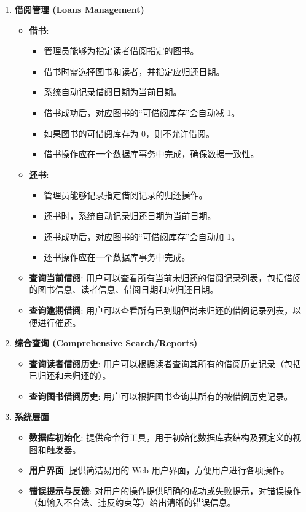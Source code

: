 \documentclass[11pt, a4paper]{article}
\begin{document}
\begin{enumerate}
    \item \textbf{借阅管理 (Loans Management)}
    \begin{itemize}
        \item \textbf{借书}:
        \begin{itemize}
            \item 管理员能够为指定读者借阅指定的图书。
            \item 借书时需选择图书和读者，并指定应归还日期。
            \item 系统自动记录借阅日期为当前日期。
            \item 借书成功后，对应图书的“可借阅库存”会自动减 1。
            \item 如果图书的可借阅库存为 0，则不允许借阅。
            \item 借书操作应在一个数据库事务中完成，确保数据一致性。
        \end{itemize}
        \item \textbf{还书}:
        \begin{itemize}
            \item 管理员能够记录指定借阅记录的归还操作。
            \item 还书时，系统自动记录归还日期为当前日期。
            \item 还书成功后，对应图书的“可借阅库存”会自动加 1。
            \item 还书操作应在一个数据库事务中完成。
        \end{itemize}
        \item \textbf{查询当前借阅}: 用户可以查看所有当前未归还的借阅记录列表，包括借阅的图书信息、读者信息、借阅日期和应归还日期。
        \item \textbf{查询逾期借阅}: 用户可以查看所有已到期但尚未归还的借阅记录列表，以便进行催还。
    \end{itemize}

    \item \textbf{综合查询 (Comprehensive Search/Reports)}
    \begin{itemize}
        \item \textbf{查询读者借阅历史}: 用户可以根据读者查询其所有的借阅历史记录（包括已归还和未归还的）。
        \item \textbf{查询图书借阅历史}: 用户可以根据图书查询其所有的被借阅历史记录。
    \end{itemize}

    \item \textbf{系统层面}
    \begin{itemize}
        \item \textbf{数据库初始化}: 提供命令行工具，用于初始化数据库表结构及预定义的视图和触发器。
        \item \textbf{用户界面}: 提供简洁易用的 Web 用户界面，方便用户进行各项操作。
        \item \textbf{错误提示与反馈}: 对用户的操作提供明确的成功或失败提示，对错误操作（如输入不合法、违反约束等）给出清晰的错误信息。
    \end{itemize}
\end{enumerate}
\end{document}
